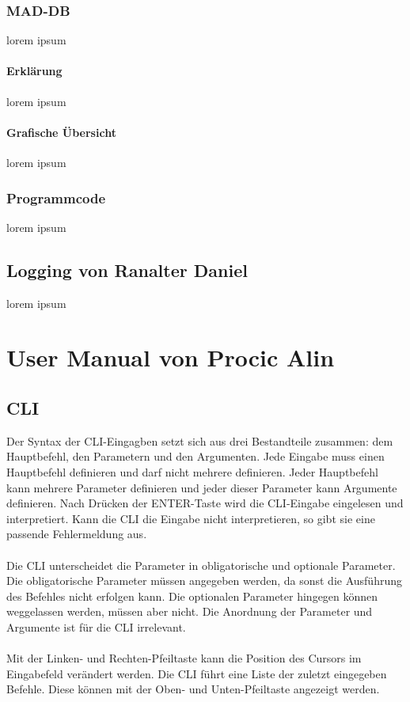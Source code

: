 \documentclass[12pt,a4paper]{report}
\begin{document}
\section{MAD-DB}
lorem ipsum
\subsection{Erklärung}
lorem ipsum
\subsection{Grafische Übersicht}
lorem ipsum
\section{Programmcode}
lorem ipsum

\chapter{Logging von Ranalter Daniel}
lorem ipsum


\part{User Manual von Procic Alin}

\chapter{CLI}

Der Syntax der CLI-Eingagben setzt sich aus drei Bestandteile zusammen: dem Hauptbefehl, den Parametern und den Argumenten. Jede Eingabe muss einen Hauptbefehl definieren und darf nicht mehrere definieren. Jeder Hauptbefehl kann mehrere Parameter definieren und jeder dieser Parameter kann Argumente definieren. Nach Drücken der ENTER-Taste wird die CLI-Eingabe eingelesen und interpretiert. Kann die CLI die Eingabe nicht interpretieren, so gibt sie eine passende Fehlermeldung aus.\\\\
Die CLI unterscheidet die Parameter in obligatorische und optionale Parameter. Die obligatorische Parameter müssen angegeben werden, da sonst die Ausführung des Befehles nicht erfolgen kann. Die optionalen Parameter hingegen können weggelassen werden, müssen aber nicht. Die Anordnung der Parameter und Argumente ist für die CLI irrelevant.\\\\
Mit der Linken- und Rechten-Pfeiltaste kann die Position des Cursors im Eingabefeld verändert werden. Die CLI führt eine Liste der zuletzt eingegeben Befehle. Diese können mit der Oben- und Unten-Pfeiltaste angezeigt werden.
\end{document}
